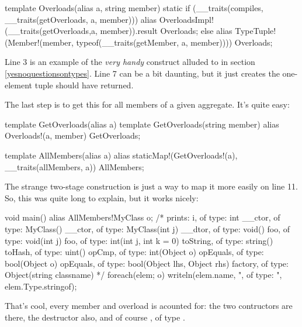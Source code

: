 \begin{dcode}
template Overloads(alias a, string member)
{
    static if (__traits(compiles, __traits(getOverloads, a, member)))
        alias OverloadsImpl!(__traits(getOverloads,a, member)).result
              Overloads;
    else
        alias TypeTuple!(Member!(member, typeof(__traits(getMember, a, member)))) 
              Overloads;
}
\end{dcode}

Line 3 is an example of the \emph{very handy}  construct alluded to in section \ref{yesnoquestionsontypes}. Line 7 can be a bit daunting, but it just creates the one-element tuple  should have returned.

The last step is to get this for all members of a given aggregate. It's quite easy:

\begin{dcode}
template GetOverloads(alias a)
{
    template GetOverloads(string member)
    {
        alias Overloads!(a, member) GetOverloads;
    }
}

template AllMembers(alias a)
{
    alias staticMap!(GetOverloads!(a), __traits(allMembers, a)) AllMembers; 
}
\end{dcode}

The strange  two-stage construction is just a way to map it more easily on line 11. So, this was quite long to explain, but it works nicely:

\begin{dcode}
void main()
{
    alias AllMembers!MyClass o;
    /*
    prints:
    i, of type: int
    __ctor, of type: MyClass()
    __ctor, of type: MyClass(int j)
    __dtor, of type: void()
    foo, of type: void(int j)
    foo, of type: int(int j, int k = 0)
    toString, of type: string()
    toHash, of type: uint()
    opCmp, of type: int(Object o)
    opEquals, of type: bool(Object o)
    opEquals, of type: bool(Object lhs, Object rhs)
    factory, of type: Object(string classname)
    */
    foreach(elem; o) 
        writeln(elem.name, ", of type: ", elem.Type.stringof);    
}
\end{dcode}

That's cool, every member and overload is acounted for: the two contructors are there, the destructor also, and of course , of type .


